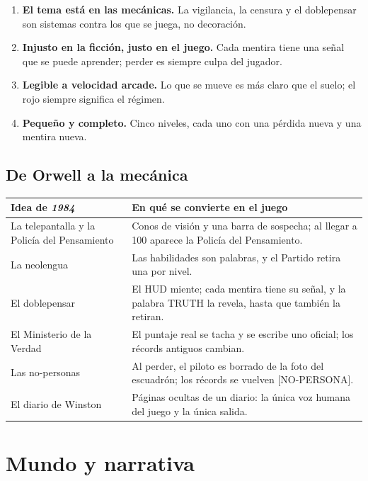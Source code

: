 \documentclass[11pt,a4paper]{article}
\newcommand{\game}[1]{{\machine\large #1}}
\begin{document}
\begin{enumerate}
  \item \textbf{El tema está en las mecánicas.} La vigilancia, la censura y el doblepensar son sistemas contra los que se juega, no decoración.
  \item \textbf{Injusto en la ficción, justo en el juego.} Cada mentira tiene una señal que se puede aprender; perder es siempre culpa del jugador.
  \item \textbf{Legible a velocidad arcade.} Lo que se mueve es más claro que el suelo; el rojo siempre significa el régimen.
  \item \textbf{Pequeño y completo.} Cinco niveles, cada uno con una pérdida nueva y una mentira nueva.
\end{enumerate}

\subsection{De Orwell a la mecánica}

\begin{center}
\begin{tabularx}{\textwidth}{>{\raggedright\arraybackslash}p{4.6cm} L}
  \toprule
  \textbf{Idea de \emph{1984}} & \textbf{En qué se convierte en el juego} \\
  \midrule
  La telepantalla y la Policía del Pensamiento & Conos de visión y una barra de sospecha; al llegar a 100 aparece la Policía del Pensamiento. \\
  La neolengua & Las habilidades son palabras, y el Partido retira una por nivel. \\
  El doblepensar & El HUD miente; cada mentira tiene su señal, y la palabra TRUTH la revela, hasta que también la retiran. \\
  El Ministerio de la Verdad & El puntaje real se tacha y se escribe uno oficial; los récords antiguos cambian. \\
  Las no-personas & Al perder, el piloto es borrado de la foto del escuadrón; los récords se vuelven \game{[NO-PERSONA]}. \\
  El diario de Winston & Páginas ocultas de un diario: la única voz humana del juego y la única salida. \\
  \bottomrule
\end{tabularx}
\end{center}

\section{Mundo y narrativa}
\end{document}
